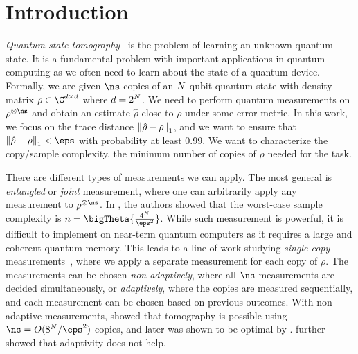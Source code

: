 \section{Introduction}

\textit{Quantum state tomography}~\cite{BBMR04,Keyl06,GJK08} is the problem of learning an unknown quantum state. It is a fundamental problem with important applications in quantum computing as we often need to learn about the state of a quantum device. 
Formally, we are given $\ns$ copies of an ${N}$-qubit quantum
state with density matrix $\rho\in \C^{\dims\times\dims}$ where $d=2^{{N}}$. We need to perform quantum
measurements on $\rho^{\otimes \ns}$ and obtain an estimate $\hat{\rho}$ close to $\rho$ under some error metric. In this work, we focus on the trace distance ${\left\|{\hat{\rho}}-\rho\right\|}_{1}$, and we want to ensure that $\tracenorm{\qest-\rho}<\eps$ with probability at least 0.99. We want to characterize the copy/sample complexity, the minimum number of copies of $\rho$ needed for the task.

There are different types of measurements we can apply. The most general is  \emph{entangled} or \emph{joint} measurement, where one can arbitrarily apply any measurement to $\rho^{\otimes \ns}$.
In \cite{HaahHJWY17,ODonnellW16,ODonnellW17}, the authors showed that the worst-case sample complexity is $n =\bigTheta{\frac{4^\nqubits}{\eps^2}}$. 
While such measurement is powerful, it is difficult to implement on near-term quantum computers as it requires a large and coherent quantum memory.  
This leads to a line of work studying \emph{single-copy} measurements~\cite{Flammia_2012,KRT14,HaahHJWY17,chen2023does}, where we apply a separate measurement for each copy of $\rho$. 
The measurements can be chosen \emph{non-adaptively}, where all $\ns$ measurements are decided simultaneously, or \emph{adaptively}, where the copies are measured sequentially, and each measurement can be chosen based on previous outcomes. 
With non-adaptive measurements, \cite{KRT14} showed that 
tomography is possible using $\ns = O(8^\nqubits / \eps^2)$ copies, and later was shown to be optimal by \cite{HaahHJWY17}. \cite{chen2023does} further showed that adaptivity does not help. 

